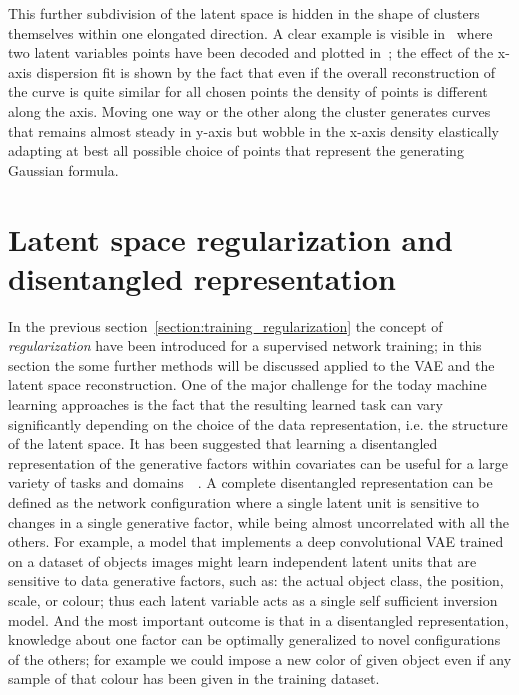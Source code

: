 This further subdivision of the latent space is hidden in the shape of clusters themselves within one elongated direction. A clear example is visible in~\Figure{\ref{fig:step1_elastic}} where two latent variables points have been decoded and plotted in~\Figure{\ref{fig:step1_elastic_gn1}\ref{fig:step1_elastic_gn2}}; the effect of the x-axis dispersion fit is shown by the fact that even if the overall reconstruction of the curve is quite similar for all chosen points the density of points is different along the axis. Moving one way or the other along the cluster generates curves that remains almost steady in y-axis but wobble in the x-axis density elastically adapting at best all possible choice of points that represent the generating Gaussian formula.

\section{Latent space regularization and disentangled representation}
In the previous section~\cref{section:training_regularization} the concept of \textit{regularization} have been introduced for a supervised network training; in this section the some further methods will be discussed applied to the \acs{VAE} and the latent space reconstruction.
%
One of the major challenge for the today machine learning approaches is the fact that the resulting learned task can vary significantly depending on the choice of the data representation, i.e. the structure of the latent space.
It has been suggested that learning a disentangled representation of the generative factors within covariates can be useful for a large variety of tasks and domains~\cite{Bengio_2013}~\cite{ridgeway2016survey}. A complete disentangled representation can be defined as the network configuration where a single latent unit is sensitive to changes in a single generative factor, while being almost uncorrelated with all the others.
For example, a model that implements a deep convolutional \acs{VAE} trained on a dataset of objects images might learn independent latent units that are sensitive to data generative factors, such as: the actual object class, the position, scale, or colour; thus each latent variable acts as a single self sufficient inversion model. And the most important outcome is that in a disentangled representation, knowledge about one factor can be optimally generalized to novel configurations of the others; for example we could impose a new color of given object even if any sample of that colour has been given in the training dataset.

